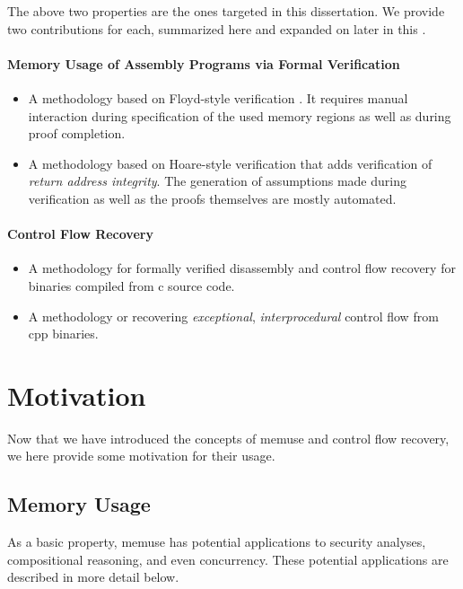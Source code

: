 The above two properties are the ones targeted in this dissertation.
We provide two contributions for each, summarized here and expanded on later in this .
\paragraph{Memory Usage of Assembly Programs via Formal Verification}
\begin{itemize}
  \item A methodology based on Floyd-style verification \autocite{floyd1967assigning}.
  It requires manual interaction during specification of the used memory regions as well as during proof completion.
  \item A methodology based on Hoare-style verification \autocite{hoare1969axiomatic} that adds verification of \emph{return address integrity}.
  The generation of assumptions made during verification as well as the proofs themselves are mostly automated.
\end{itemize}

\paragraph{Control Flow Recovery}
\begin{itemize}
  \item A methodology for formally verified disassembly and control flow recovery for binaries compiled from \gls{c} source code.
  \item A methodology or recovering \emph{exceptional}, \emph{interprocedural} control flow from \gls{cpp} binaries.
\end{itemize}

\section{Motivation}
Now that we have introduced the concepts of \gls{memuse} and control flow recovery, we here provide some motivation for their usage.

\subsection{Memory Usage}
As a basic property, \gls{memuse} has potential applications to security analyses, compositional reasoning, and even concurrency.
These potential applications are described in more detail below.

